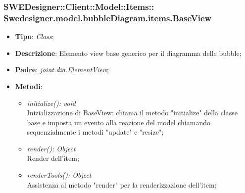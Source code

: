 \documentclass[../DefinizioneDiProdotto.tex]{subfiles}
\begin{document}
			\subsubsection[Swedesigner.model.bubbleDiagram.items.BaseView]{SWEDesigner::Client::Model::Items::\\Swedesigner.model.bubbleDiagram.items.BaseView}
			\hypertarget{SWEDesigner::Client::Model::Items::Swedesigner.model.bubbleDiagram.items.BaseView}{}
			\begin{itemize}
				\item \textbf{Tipo}: \emph{Class};
				\item \textbf{Descrizione}: Elemento view base generico per il diagramma delle bubble;
				\item \textbf{Padre}: \emph{joint.dia.ElementView};
				\item \textbf{Metodi}:
				\begin{itemize}
					\item \emph{initialize(): void}\\
					Inizializzazione di BaseView: chiama il metodo "initialize" della classe base e imposta un evento alla reazione del model chiamando sequenzialmente i metodi "update" e "resize";
					\item \emph{render(): Object}\\
					Render dell'item;
					\item \emph{renderTools(): Object}\\
					Assistenza al metodo "render" per la renderizzazione dell'item;
				\end{itemize}
			\end{itemize}
			
\end{document}
